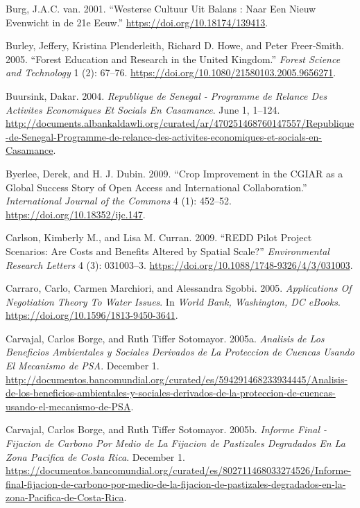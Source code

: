 \begin{CSLReferences}{1}{1}
Burg, J.A.C. van. 2001. {``Westerse Cultuur Uit Balans : Naar Een Nieuw
Evenwicht in de 21e Eeuw.''} \url{https://doi.org/10.18174/139413}.

Burley, Jeffery, Kristina Plenderleith, Richard D. Howe, and Peter
Freer‐Smith. 2005. {``Forest Education and Research in the United
Kingdom.''} \emph{Forest Science and Technology} 1 (2): 67--76.
\url{https://doi.org/10.1080/21580103.2005.9656271}.

Buursink, Dakar. 2004. \emph{Republique de Senegal - Programme de
Relance Des Activites Economiques Et Socials En Casamance}. June 1,
1--124.
\url{http://documents.albankaldawli.org/curated/ar/470251468760147557/Republique-de-Senegal-Programme-de-relance-des-activites-economiques-et-socials-en-Casamance}.

Byerlee, Derek, and H. J. Dubin. 2009. {``Crop Improvement in the CGIAR
as a Global Success Story of Open Access and International
Collaboration.''} \emph{International Journal of the Commons} 4 (1):
452--52. \url{https://doi.org/10.18352/ijc.147}.

Carlson, Kimberly M., and Lisa M. Curran. 2009. {``REDD Pilot Project
Scenarios: Are Costs and Benefits Altered by Spatial Scale?''}
\emph{Environmental Research Letters} 4 (3): 031003--3.
\url{https://doi.org/10.1088/1748-9326/4/3/031003}.

Carraro, Carlo, Carmen Marchiori, and Alessandra Sgobbi. 2005.
\emph{Applications Of Negotiation Theory To Water Issues}. In
\emph{World Bank, Washington, DC eBooks}.
\url{https://doi.org/10.1596/1813-9450-3641}.

Carvajal, Carlos Borge, and Ruth Tiffer Sotomayor. 2005a. \emph{Analisis
de Los Beneficios Ambientales y Sociales Derivados de La Proteccion de
Cuencas Usando El Mecanismo de PSA}. December 1.
\url{http://documentos.bancomundial.org/curated/es/594291468233934445/Analisis-de-los-beneficios-ambientales-y-sociales-derivados-de-la-proteccion-de-cuencas-usando-el-mecanismo-de-PSA}.

Carvajal, Carlos Borge, and Ruth Tiffer Sotomayor. 2005b. \emph{Informe
Final - Fijacion de Carbono Por Medio de La Fijacion de Pastizales
Degradados En La Zona Pacifica de Costa Rica}. December 1.
\url{https://documentos.bancomundial.org/curated/es/802711468033274526/Informe-final-fijacion-de-carbono-por-medio-de-la-fijacion-de-pastizales-degradados-en-la-zona-Pacifica-de-Costa-Rica}.


\end{CSLReferences}
